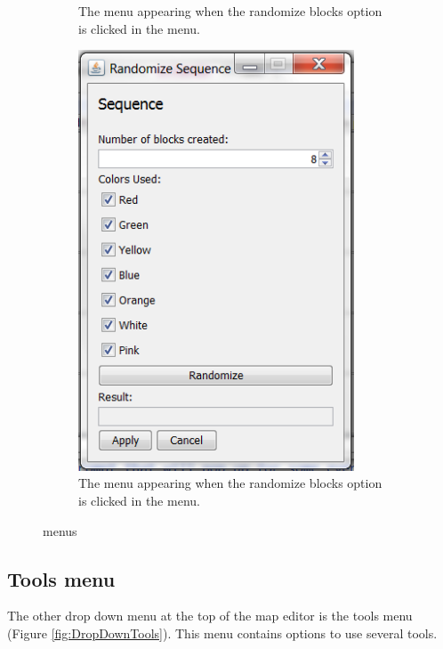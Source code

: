 \begin{figure}[h!!!]
\begin{subfigure}[b]{0.32\textwidth}
	\caption{The menu appearing when the randomize blocks option is clicked in the menu.}
	\label{fig:MenuBlocks}
        \end{subfigure}
        \begin{subfigure}[b]{0.32\textwidth}
	\center
	\includegraphics[width=0.9\textwidth]{EnvironmentStore/MenuSeq.png}
	\caption{The menu appearing when the randomize blocks option is clicked in the menu.}
	\label{fig:MenuSeq}
        \end{subfigure}

        \caption{menus}\label{fig:whatever}
\end{figure}

\subsection{Tools menu}
The other drop down menu at the top of the map editor is the tools menu (Figure \ref{fig:DropDownTools}). This menu contains options to use several tools.



